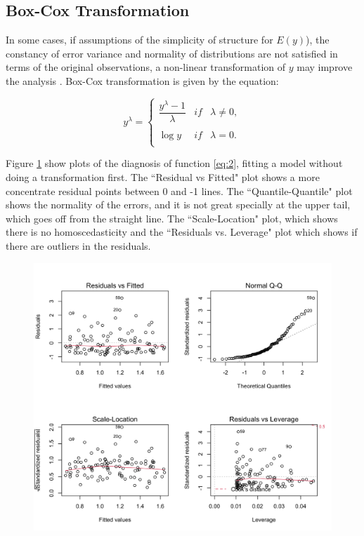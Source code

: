 \documentclass[10pt,leter,openany]{article}
\begin{document}
	\subsection{Box-Cox Transformation}
	
		In some cases, if assumptions of the simplicity of structure for $E(y)$), the constancy of error variance and normality of distributions are not satisfied in terms of the original observations, a non-linear transformation of $y$ may improve the analysis \citep{box1964analysis}.  Box-Cox transformation is given by the equation:


		\begin{equation}
			y^{\lambda}= \left\{ \begin{array}{lcc}
				\dfrac{y^{\lambda}-1}{\lambda} &   if  & \lambda \neq 0, \\
				\\ \log y &  if & \lambda = 0. \\
			\end{array}
			\right.
		\end{equation}

		Figure \ref{fig:lr_df2} show plots of the diagnosis of  function \ref{eq:2}, fitting a model without doing a transformation first. The ``Residual vs Fitted" plot shows a more concentrate residual points between  0 and -1 lines. The ``Quantile-Quantile" plot shows the normality of the errors, and it is not great specially at the upper tail, which goes off from the straight line. The ``Scale-Location" plot, which shows there is no homoscedasticity and the ``Residuals vs. Leverage" plot which shows if there are outliers in the residuals.

		\begin{figure}
			\begin{center}
				\includegraphics[scale=0.23]{extras/plots_df2}
				\label{fig:lr_df2}
			\end{center}
		\end{figure}
\end{document}
